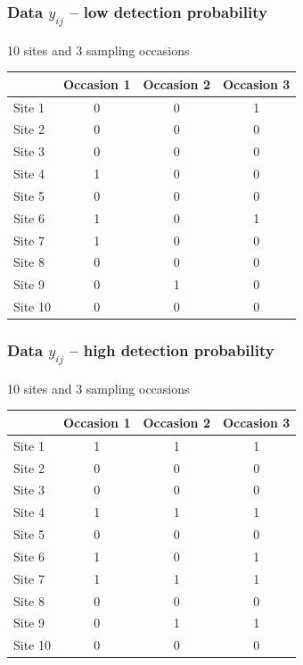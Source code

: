 \documentclass[color=usenames,dvipsnames]{beamer}\usepackage[]{graphicx}\usepackage[]{xcolor}
\begin{document}
\begin{frame}
  \frametitle{Data $y_{ij}$ -- low detection probability}
  {%
    \centering \large 10 sites and 3 sampling occasions \par}
  \vspace{0.3cm}
  \begin{center}
    \small
    \begin{tabular}{lccc}
      \hline
      & Occasion 1 & Occasion 2 & Occasion 3 \\
      \hline
      Site 1 & 0 & 0 & 1 \\
      Site 2 & 0 & 0 & 0 \\
      Site 3 & 0 & 0 & 0 \\
      Site 4 & 1 & 0 & 0 \\
      Site 5 & 0 & 0 & 0 \\
      Site 6 & 1 & 0 & 1 \\
      Site 7 & 1 & 0 & 0 \\
      Site 8 & 0 & 0 & 0 \\
      Site 9 & 0 & 1 & 0 \\
      Site 10 & 0 & 0 & 0 \\
      \hline
    \end{tabular}
  \end{center}
\end{frame}





\begin{frame}
  \frametitle{Data $y_{ij}$ -- high detection probability}
  {%
    \centering \large 10 sites and 3 sampling occasions \par}
  \vspace{0.3cm}
  \begin{center}
    \small
    \begin{tabular}{lccc}
      \hline
      & Occasion 1 & Occasion 2 & Occasion 3 \\
      \hline
      Site 1 & 1 & 1 & 1 \\
      Site 2 & 0 & 0 & 0 \\
      Site 3 & 0 & 0 & 0 \\
      Site 4 & 1 & 1 & 1 \\
      Site 5 & 0 & 0 & 0 \\
      Site 6 & 1 & 0 & 1 \\
      Site 7 & 1 & 1 & 1 \\
      Site 8 & 0 & 0 & 0 \\
      Site 9 & 0 & 1 & 1 \\
      Site 10 & 0 & 0 & 0 \\
      \hline
    \end{tabular}
  \end{center}
\end{frame}
\end{document}
